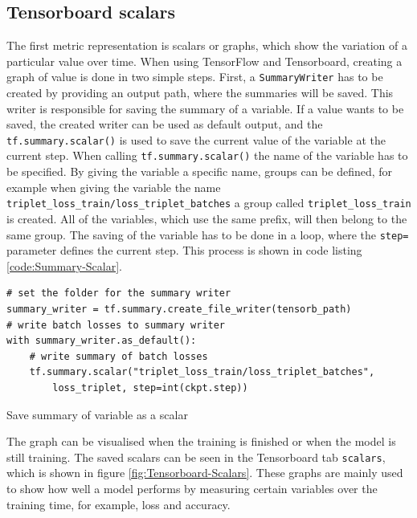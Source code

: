 \subsection{Tensorboard scalars}
\label{sub:Tensorboard-Scalars}
The first metric representation is scalars or graphs, which show the variation of a particular value over time. When using TensorFlow and Tensorboard, creating a graph of value is done in two simple steps. First, a \texttt{SummaryWriter} has to be created by providing an output path, where the summaries will be saved. This writer is responsible for saving the summary of a variable. If a value wants to be saved, the created writer can be used as default output, and the \texttt{tf.summary.scalar()} is used to save the current value of the variable at the current step. When calling \texttt{tf.summary.scalar()} the name of the variable has to be specified. By giving the variable a specific name, groups can be defined, for example when giving the variable the name \texttt{triplet\_loss\_train/loss\_triplet\_batches} a group called \texttt{triplet\_loss\_train} is created. All of the variables, which use the same prefix, will then belong to the same group. The saving of the variable has to be done in a loop, where the \texttt{step=} parameter defines the current step. This process is shown in code listing \ref{code:Summary-Scalar}.

\begin{code}[htbp]
\begin{verbatim}
# set the folder for the summary writer
summary_writer = tf.summary.create_file_writer(tensorb_path)
# write batch losses to summary writer
with summary_writer.as_default():
    # write summary of batch losses
    tf.summary.scalar("triplet_loss_train/loss_triplet_batches", 
        loss_triplet, step=int(ckpt.step))
\end{verbatim}
\caption{Save summary of variable as a scalar}
\label{code:Summary-Scalar}
\end{code}
\noindent
The graph can be visualised when the training is finished or when the model is still training. The saved scalars can be seen in the Tensorboard tab \texttt{scalars}, which is shown in figure \ref{fig:Tensorboard-Scalars}. These graphs are mainly used to show how well a model performs by measuring certain variables over the training time, for example, loss and accuracy.

